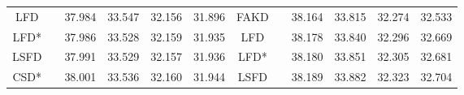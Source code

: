 \documentclass[10pt,twocolumn,letterpaper]{article}
\begin{document}
\begin{table*}[h]
{\begin{tabular}{|c|c|c|c|c|c|c|c|c|c|c|c|}
\multicolumn{1}{|c|}{LFD}         &     & \multicolumn{1}{c|}{37.984} & \multicolumn{1}{c|}{{33.547}} & \multicolumn{1}{c|}{32.156} & \multicolumn{1}{c|}{31.896}   & \multicolumn{1}{c|}{FAKD}        &    & \multicolumn{1}{c|}{38.164} & \multicolumn{1}{c|}{33.815} & \multicolumn{1}{c|}{32.274} & \multicolumn{1}{c|}{32.533}   \\

\multicolumn{1}{|c|}{LFD*}         &     & \multicolumn{1}{c|}{37.986} & \multicolumn{1}{c|}{{33.528}} & \multicolumn{1}{c|}{32.159} & \multicolumn{1}{c|}{31.935}   & \multicolumn{1}{c|}{LFD}         &    & \multicolumn{1}{c|}{38.178} & \multicolumn{1}{c|}{33.840} & \multicolumn{1}{c|}{32.296} & \multicolumn{1}{c|}{32.669}   \\

\multicolumn{1}{|c|}{LSFD}        &     & \multicolumn{1}{c|}{{37.991}} & \multicolumn{1}{c|}{{33.529}} & \multicolumn{1}{c|}{{32.157}} & \multicolumn{1}{c|}{{31.936}}   & \multicolumn{1}{c|}{LFD*}         &     & \multicolumn{1}{c|}{38.180} & \multicolumn{1}{c|}{33.851} & \multicolumn{1}{c|}{32.305} & \multicolumn{1}{c|}{32.681}   \\

\multicolumn{1}{|c|}{CSD*}       &     & \multicolumn{1}{c|}{38.001} & \multicolumn{1}{c|}{33.536} & \multicolumn{1}{c|}{32.160} & \multicolumn{1}{c|}{31.944}   & \multicolumn{1}{c|}{LSFD}        &   & \multicolumn{1}{c|}{{38.189}} & \multicolumn{1}{c|}{{33.882}} & \multicolumn{1}{c|}{{32.323}} & \multicolumn{1}{c|}{{32.704}}   \\


\end{tabular}}
\end{table*}
\end{document}
